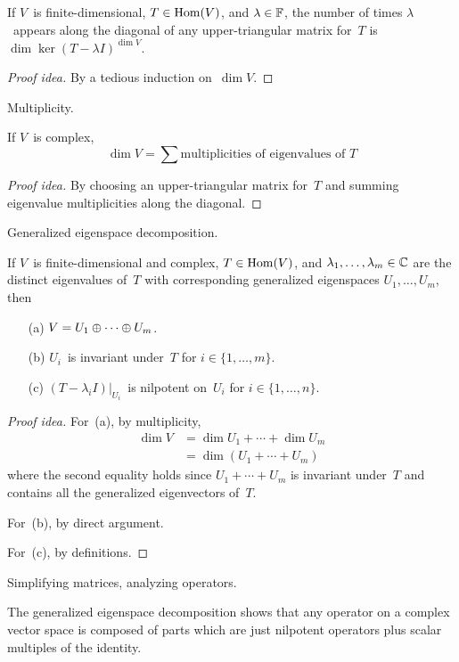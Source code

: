 \begin{thm}
If \(V\)~is finite-dimensional, \(T\in\operatorname{Hom}(V)\), and \(\lambda\in\mathbb{F}\), the number of times \(\lambda\)~appears along the diagonal of any upper-triangular matrix for~\(T\) is \(\dim\ker(T-\lambda I)^{\dim V}\).
\end{thm}
\begin{proof}[Proof idea]
By a tedious induction on~\(\dim V\).
\end{proof}
\begin{app}
Multiplicity.
\end{app}

\begin{cor}
If \(V\)~is complex,
\[\dim V=\sum\text{multiplicities of eigenvalues of~\(T\)}\]
\end{cor}
\begin{proof}[Proof idea]
By choosing an upper-triangular matrix for~\(T\) and summing eigenvalue multiplicities along the diagonal.
\end{proof}
\begin{app}
Generalized eigenspace decomposition.
\end{app}

\begin{thm}
If \(V\)~is finite-dimensional and complex, \(T\in\operatorname{Hom}(V)\), and \(\lambda_1,\ldots,\lambda_m\in\mathbb{C}\) are the distinct eigenvalues of~\(T\) with corresponding generalized eigenspaces \(U_1,\ldots,U_m\), then
\begin{enumerate}[itemsep=0pt]
\item[(a)] \(V=U_1\oplus\cdots\oplus U_m\).
\item[(b)] \(U_i\)~is invariant under~\(T\) for \(i\in\{1,\ldots,m\}\).
\item[(c)] \((T-\lambda_i I)|_{U_i}\)~is nilpotent on~\(U_i\) for \(i\in\{1,\ldots,n\}\).
\end{enumerate}
\end{thm}
\begin{proof}[Proof idea]
For~(a), by multiplicity,
\begin{align*}
\dim V&=\dim U_1+\cdots+\dim U_m\\
	&=\dim(U_1+\cdots+U_m)
\end{align*}
where the second equality holds since \(U_1+\cdots+U_m\) is invariant under~\(T\) and contains all the generalized eigenvectors of~\(T\).

For~(b), by direct argument.

For~(c), by definitions.
\end{proof}
\begin{app}
Simplifying matrices, analyzing operators.
\end{app}
\begin{rmk}
The generalized eigenspace decomposition shows that any operator on a complex vector space is composed of parts which are just nilpotent operators plus scalar multiples of the identity.
\end{rmk}

